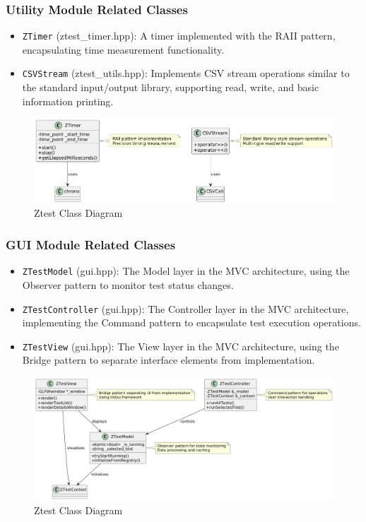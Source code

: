 \documentclass{article}
\begin{document}
\subsubsection{Utility Module Related Classes}
\begin{itemize}
    \item \texttt{ZTimer} (ztest\_timer.hpp): A timer implemented with the RAII pattern, encapsulating time measurement functionality.
    \item \texttt{CSVStream} (ztest\_utils.hpp): Implements CSV stream operations similar to the standard input/output library, supporting read, write, and basic information printing.
\end{itemize}
\begin{figure}[H]
    \centering
    \includegraphics[width = \textwidth]{img/c7.png} %
    \caption{Ztest Class Diagram}
    \label{fig:ztest class }
\end{figure}
\subsubsection{GUI Module Related Classes}
\begin{itemize}
    \item \texttt{ZTestModel} (gui.hpp): The Model layer in the MVC architecture, using the Observer pattern to monitor test status changes.
    \item \texttt{ZTestController} (gui.hpp): The Controller layer in the MVC architecture, implementing the Command pattern to encapsulate test execution operations.
    \item \texttt{ZTestView} (gui.hpp): The View layer in the MVC architecture, using the Bridge pattern to separate interface elements from implementation.
\end{itemize}
\begin{figure}[H]
    \centering
    \includegraphics[width = \textwidth]{img/c8.png} %
    \caption{Ztest Class Diagram}
    \label{fig:ztest class }
\end{figure}
\end{document}
